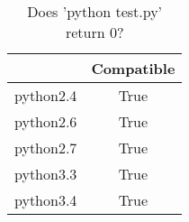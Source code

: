 \begin{table}[htp]
	\begin{center}
	\caption{Does 'python test.py' return 0?}
	\label{tab:compatibleTable}
		\begin{tabular}{rc}
		\toprule
			{} & {Compatible}\\
			\midrule
			{python2.4} & True\\
			{python2.6} & True\\
			{python2.7} & True\\
			{python3.3} & True\\
			{python3.4} & True\\
		\bottomrule
		\end{tabular}
	\end{center}
\end{table}
